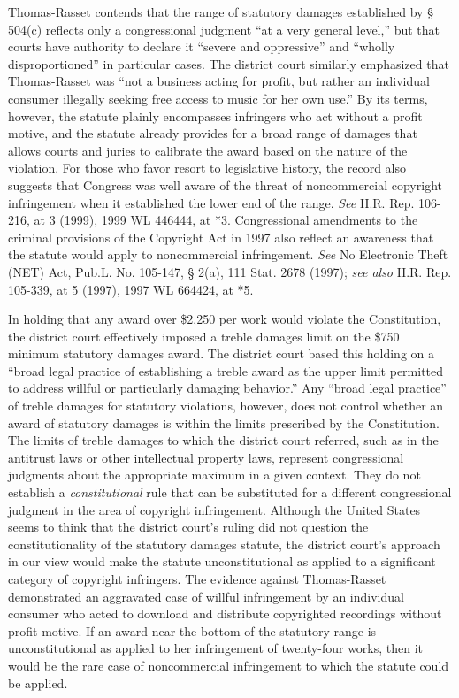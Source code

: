 Thomas-Rasset contends that the range of statutory damages established by {\S}
504(c) reflects only a congressional judgment ``at a very general level,'' but
that courts have authority to declare it ``severe and oppressive'' and ``wholly
disproportioned'' in particular cases. The district court similarly emphasized
that Thomas-Rasset was ``not a business acting for profit, but rather an
individual consumer illegally seeking free access to music for her own use.''
By its terms, however, the statute plainly encompasses infringers who act
without a profit motive, and the statute already provides for a broad range of
damages that allows courts and juries to calibrate the award based on the
nature of the violation. For those who favor resort to legislative history, the
record also suggests that Congress was well aware of the threat of
noncommercial copyright infringement when it established the lower end of the
range. \textit{See} H.R. Rep. 106-216, at 3 (1999), 1999 WL 446444, at *3.
Congressional amendments to the criminal provisions of the Copyright Act in
1997 also reflect an awareness that the statute would apply to noncommercial
infringement. \textit{See} No Electronic Theft (NET) Act, Pub.L. No. 105-147,
{\S} 2(a), 111 Stat. 2678 (1997); \textit{see also} H.R. Rep. 105-339, at 5
(1997), 1997 WL 664424, at *5.

In holding that any award over \$2,250 per work would violate the Constitution,
the district court effectively imposed a treble damages limit on the \$750
minimum statutory damages award. The district court based this holding on a
``broad legal practice of establishing a treble award as the upper limit
permitted to address willful or particularly damaging behavior.'' Any ``broad
legal practice'' of treble damages for statutory violations, however, does not
control whether an award of statutory damages is within the limits prescribed
by the Constitution. The limits of treble damages to which the district court
referred, such as in the antitrust laws or other intellectual property laws,
represent congressional judgments about the appropriate maximum in a given
context. They do not establish a \textit{constitutional} rule that can be
substituted for a different congressional judgment in the area of copyright
infringement. Although the United States seems to think that the district
court's ruling did not question the constitutionality of the statutory damages
statute, the district court's approach in our view would make the statute
unconstitutional as applied to a significant category of copyright infringers.
The evidence against Thomas-Rasset demonstrated an aggravated case of willful
infringement by an individual consumer who acted to download and distribute
copyrighted recordings without profit motive. If an award near the bottom of
the statutory range is unconstitutional as applied to her infringement of
twenty-four works, then it would be the rare case of noncommercial infringement
to which the statute could be applied.

